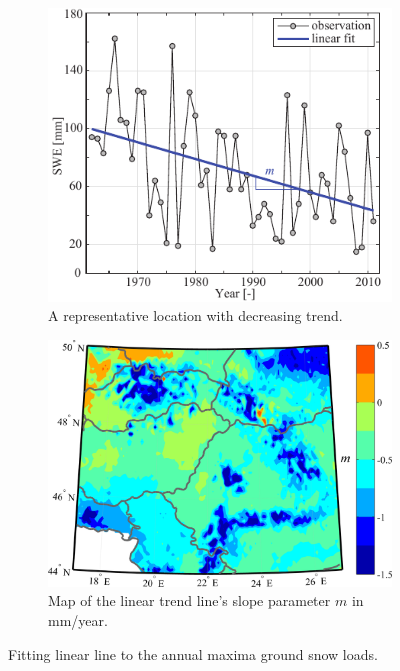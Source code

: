 \begin{figure}[htbp!]
	\begin{subfigure}[b]{0.43\textwidth}    
		\includegraphics[width=\textwidth]{sample_time_trend.pdf}
		\caption{A representative location with decreasing trend.}
		\label{fig:trend_line}
	\end{subfigure}
	\hfill
	\begin{subfigure}[b]{0.52\textwidth}
		\includegraphics[width=\textwidth]{amax_timetrend_linreg_slope_paper.jpg}
		\caption{Map of the linear trend line’s slope parameter $m$ in mm/year.}
		\label{fig:trend_map}
	\end{subfigure}
	\caption{Fitting linear line to the annual maxima ground snow loads.}
\end{figure}

